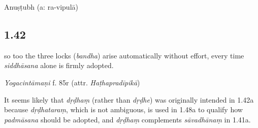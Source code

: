 \begin{ekdosis}
\begin{testimonia}[hp01_041]
\begin{versinnote}
\end{versinnote}

\end{testimonia}


\begin{metre}[hp01_041]
Anuṣṭubh (a: ra-vipulā)
\end{metre}

\subsection*{1.42}
\begin{translation}[hp01_042]
[...] so too the three locks (\emph{bandha}) arise automatically without effort, every time \emph{siddhāsana} alone is firmly adopted.
\end{translation}

\begin{testimonia}[hp01_042]
\emph{Yogacintāmaṇi} f. 85r (attr. \emph{Haṭhapradīpikā})

\begin{versinnote}
\end{versinnote}


\end{testimonia}

\begin{philcomm}[hp01_042]
It seems likely that \emph{dṛḍhaṃ} (rather than \emph{dṛḍhe}) was originally intended in 1.42a because \emph{dṛḍhataraṃ}, which is not ambiguous, is used in 1.48a to qualify how \emph{padmāsana} should be adopted, and \emph{dṛḍhaṃ} complements \emph{sāvadhānaṃ} in 1.41a.
\end{philcomm}


\end{ekdosis}
